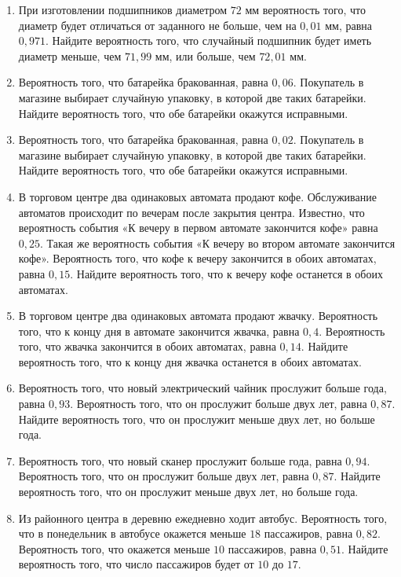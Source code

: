 \documentclass[12pt, a4paper]{article}
\begin{document}
\begin{enumerate}
		\item При изготовлении подшипников диаметром \( 72 \) мм вероятность того, что диаметр будет отличаться от заданного не больше, чем на \( 0,01 \) мм, равна \( 0,971 \). Найдите вероятность того, что случайный подшипник будет иметь диаметр меньше, чем \( 71,99 \) мм, или больше, чем \( 72,01 \) мм.
		\item Вероятность того, что батарейка бракованная, равна \( 0,06 \). Покупатель в магазине выбирает случайную упаковку, в которой две таких батарейки. Найдите вероятность того, что обе батарейки окажутся исправными.
		\item Вероятность того, что батарейка бракованная, равна \( 0,02 \). Покупатель в магазине выбирает случайную упаковку, в которой две таких батарейки. Найдите вероятность того, что обе батарейки окажутся исправными.
		\item В торговом центре два одинаковых автомата продают кофе. Обслуживание автоматов происходит по вечерам после закрытия центра. Известно, что вероятность события «К вечеру в первом автомате закончится кофе» равна \(  0,25 \). Такая же вероятность события «К вечеру во втором автомате закончится кофе». Вероятность того, что кофе к вечеру закончится в обоих автоматах, равна \( 0,15 \). Найдите вероятность того, что к вечеру кофе останется в обоих автоматах.
		\item В торговом центре два одинаковых автомата продают жвачку. Вероятность того, что к концу дня в автомате закончится жвачка, равна \( 0,4 \). Вероятность того, что жвачка закончится в обоих автоматах, равна \( 0,14 \). Найдите вероятность того, что к концу дня жвачка останется в обоих автоматах.
		\item Вероятность того, что новый электрический чайник прослужит больше года, равна \( 0,93 \). Вероятность того, что он прослужит больше двух лет, равна \( 0,87 \). Найдите вероятность того, что он прослужит меньше двух лет, но больше года.
		\item Вероятность того, что новый сканер прослужит больше года, равна \( 0,94 \). Вероятность того, что он прослужит больше двух лет, равна \( 0,87 \). Найдите вероятность того, что он прослужит меньше двух лет, но больше года.
		\item Из районного центра в деревню ежедневно ходит автобус. Вероятность того, что в понедельник в автобусе окажется меньше \( 18 \) пассажиров, равна \( 0,82 \). Вероятность того, что окажется меньше \( 10 \) пассажиров, равна \( 0,51 \). Найдите вероятность того, что число пассажиров будет от \( 10 \) до \( 17 \).

\end{enumerate}
\end{document}
